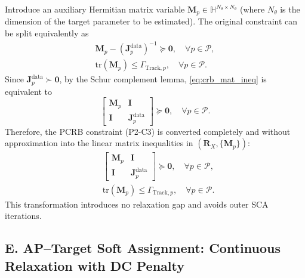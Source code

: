 \documentclass[12pt,a4paper]{article}
\newcommand{\mat}[1]{\mathbf{#1}}
\newcommand{\tr}{\text{tr}}
\begin{document}
Introduce an auxiliary Hermitian matrix variable $\mat{M}_p \in \mathbb{H}^{N_\theta \times N_\theta}$ (where $N_\theta$ is the dimension of the target parameter to be estimated). The original constraint can be split equivalently as
\begin{subequations}\label{eq:crb_decouple}
\begin{align}
\mat{M}_p - (\mat{J}_p^{\text{data}})^{-1} \succeq \mat{0}, \quad \forall p \in \mathcal{P}, \label{eq:crb_mat_ineq} \\
\tr(\mat{M}_p) \leq \Gamma_{\text{Track},p}, \quad \forall p \in \mathcal{P}. \label{eq:crb_trace_ineq}
\end{align}
\end{subequations}
Since $\mat{J}_p^{\text{data}} \succ \mat{0}$, by the Schur complement lemma, \eqref{eq:crb_mat_ineq} is equivalent to
\begin{equation}\label{eq:crb_lmi}
\begin{bmatrix} \mat{M}_p & \mat{I} \\ \mat{I} & \mat{J}_p^{\text{data}} \end{bmatrix} \succeq \mat{0}, \quad \forall p \in \mathcal{P}.
\end{equation}
Therefore, the PCRB constraint (P2-C3) is converted completely and without approximation into the linear matrix inequalities in $(\mat{R}_X, \{\mat{M}_p\})$:
\begin{subequations}\label{eq:crb_lmi_final}
\begin{align}
& \begin{bmatrix} \mat{M}_p & \mat{I} \\ \mat{I} & \mat{J}_p^{\text{data}} \end{bmatrix} \succeq \mat{0}, \quad \forall p \in \mathcal{P}, \label{eq:crb_lmi_final_a} \\
& \tr(\mat{M}_p) \leq \Gamma_{\text{Track},p}, \quad \forall p \in \mathcal{P}. \label{eq:crb_lmi_final_b}
\end{align}
\end{subequations}
This transformation introduces no relaxation gap and avoids outer SCA iterations.

\subsection*{E. AP--Target Soft Assignment: Continuous Relaxation with DC Penalty}
\end{document}
